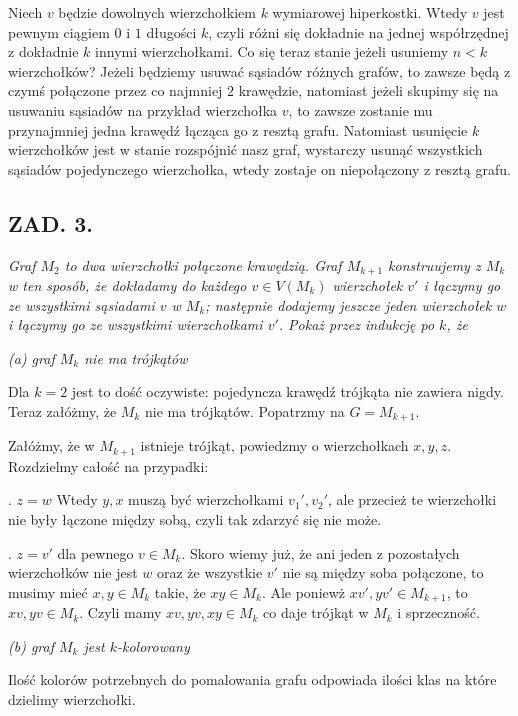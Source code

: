 \documentclass{article}
\begin{document}
\medskip

Niech $v$ będzie dowolnych wierzchołkiem $k$ wymiarowej hiperkostki. Wtedy $v$ jest pewnym ciągiem $0$ i $1$ długości $k$, czyli różni się dokładnie na jednej współrzędnej z dokładnie $k$ innymi wierzchołkami. Co się teraz stanie jeżeli usuniemy $n<k$ wierzchołków? Jeżeli będziemy usuwać sąsiadów różnych grafów, to zawsze będą z czymś połączone przez co najmniej $2$ krawędzie, natomiast jeżeli skupimy się na usuwaniu sąsiadów na przykład wierzchołka $v$, to zawsze zostanie mu przynajmniej jedna krawędź łącząca go z resztą grafu. Natomiast usunięcie $k$ wierzchołków jest w stanie rozspójnić nasz graf, wystarczy usunąć wszystkich sąsiadów pojedynczego wierzchołka, wtedy zostaje on niepołączony z resztą grafu.

\subsection*{ZAD. 3.}
\emph{Graf $M_2$ to dwa wierzchołki połączone krawędzią. Graf $M_{k+1}$ konstruujemy z $M_k$ w ten sposób, że dokładamy do każdego $v\in V(M_k)$ wierzchołek $v'$ i łączymy go ze wszystkimi sąsiadami $v$ w $M_k$; następnie dodajemy jeszcze jeden wierzchołek $w$ i łączymy go ze wszystkimi wierzchołkami $v'$. Pokaż przez indukcję po $k$, że}
\smallskip

\point \emph{\color{acc}(a) graf $M_k$ nie ma trójkątów}
\smallskip

Dla $k=2$ jest to dość oczywiste: pojedyncza krawędź trójkąta nie zawiera nigdy. Teraz załóżmy, że $M_k$ nie ma trójkątów. Popatrzmy na $G=M_{k+1}$.

Załóżmy, że w $M_{k+1}$ istnieje trójkąt, powiedzmy o wierzchołkach $x,y,z$. Rozdzielmy całość na przypadki:

. $z=w$ Wtedy $y,x$ muszą być wierzchołkami $v_1',v_2'$, ale przecież te wierzchołki nie były łączone między sobą, czyli tak zdarzyć się nie może. 

. $z=v'$ dla pewnego $v\in M_k$. Skoro wiemy już, że ani jeden z pozostałych wierzchołków nie jest $w$ oraz że wszystkie $v'$ nie są między soba połączone, to musimy mieć $x,y\in M_k$ takie, że $xy\in M_k$. Ale poniewż $xv',yv'\in M_{k+1}$, to $xv,yv\in M_k$. Czyli mamy $xv,yv,xy\in M_k$ co daje trójkąt w $M_k$ i sprzeczność.
\medskip

\point \emph{\color{acc}(b) graf $M_k$ jest $k$-kolorowany}
\smallskip

Ilość kolorów potrzebnych do pomalowania grafu odpowiada ilości klas na które dzielimy wierzchołki.
\smallskip
\end{document}
